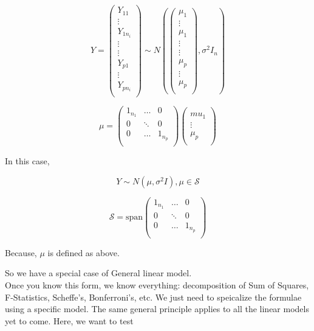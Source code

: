 \documentclass[11pt,fleqn]{book} %
\begin{document}
		$$Y = \begin{pmatrix}
			Y_{11} \\
			\vdots \\
			Y_{1 n_i}\\
			\vdots \\
			\vdots\\ 
			Y_{p1}\\
			\vdots\\
			Y_{p n_i}\\
		\end{pmatrix}  \sim N \left( \begin{pmatrix}
			\mu_1\\
			\vdots\\
			\mu_1\\
			\vdots\\
			\vdots\\
			\mu_p \\
			\vdots\\
			\mu_p\\
		\end{pmatrix}, \sigma^2 I_n \right) $$


		$$\mu = \begin{pmatrix}	
			1_{n_1} & \dots & 0 \\
			0 & \ddots &  0 \\
			0 & \dots & 1_{n_p}\\
		\end{pmatrix}	\begin{pmatrix}
			\\mu_1\\
			\vdots\\
			\mu_p\\
		\end{pmatrix} $$

	In this case, 

		$$Y \sim N(\mu, \sigma^2 I), \mu \in \mathcal{S}$$

		$$\mathcal{S} = \text{span}\begin{pmatrix}
			1_{n_1} & \dots & 0 \\
			0 & \ddots &  0 \\
			0 & \dots & 1_{n_p}\\
		\end{pmatrix} $$

		Because, $\mu$ is defined as above. 

So we have a special case of General linear model. \\

Once you know this form, we know everything: decomposition of Sum of Squares, F-Statistics, Scheffe's, Bonferroni's, etc. We just need to speicalize the formulae using a specific model. The same general principle applies to all the linear models yet to come. Here, we want to test
\end{document}
